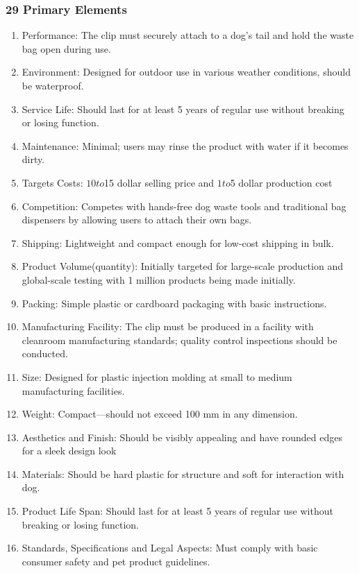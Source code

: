 \documentclass[12pt]{article}
\theoremstyle{definition} %
\theoremstyle{plain} %
\begin{document}
\subsubsection*{29 Primary Elements}
\noindent
\begin{enumerate}
  \item Performance: The clip must securely attach to a dog's tail and hold the waste
  bag open during use.
  \item Environment: Designed for outdoor use in various weather conditions,
  should be waterproof.
  \item Service Life: Should last for at least 5 years of regular use without breaking
  or losing function.
  \item Maintenance: Minimal; users may rinse the product with water if it becomes
  dirty.
  \item Targets Costs: $10 to $15 dollar selling price and $1 to $5 dollar production
  cost
  \item Competition: Competes with hands-free dog waste tools and traditional bag
  dispensers by allowing users to attach their own bags.
  \item Shipping: Lightweight and compact enough for low-cost shipping in bulk.
  \item Product Volume(quantity): Initially targeted for large-scale production and
  global-scale testing with 1 million products being made initially.
  \item Packing: Simple plastic or cardboard packaging with basic instructions.
  \item Manufacturing Facility: The clip must be produced in a facility with
  cleanroom manufacturing standards; quality control inspections should be
  conducted.
  \item Size: Designed for plastic injection molding at small to medium manufacturing
  facilities.
  \item Weight: Compact—should not exceed 100 mm in any dimension.
  \item Aesthetics and Finish: Should be visibly appealing and have rounded edges
  for a sleek design look
  \item Materials: Should be hard plastic for structure and soft for interaction with
  dog.
  \item Product Life Span: Should last for at least 5 years of regular use without
  breaking or losing function.
  \item Standards, Specifications and Legal Aspects: Must comply with basic
  consumer safety and pet product guidelines.

\end{enumerate}
\end{document}
